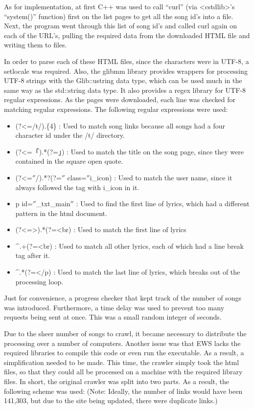 \documentclass{acm} %
\begin{document}
\begin{CJK}{UTF8}{zhsong}
As for implementation, at first C++ was used to call ``curl'' (via <cstdlib>'s ``system()'' function) first on the list pages to get all the song id's into a file. Next, the program went through this list of song id's and called curl again on each of the URL's, pulling the required data from the downloaded HTML file and writing them to files.

In order to parse each of these HTML files, since the characters were in UTF-8, a setlocale was required. Also, the glibmm library provides wrappers for processing UTF-8 strings with the Glib::ustring data type, which can be used much in the same way as the std::string data type. It also provides a regex library for UTF-8 regular expressions. As the pages were downloaded, each line was checked for matching regular expressions. The following regular expressions were used:

\begin{itemize}
 \item (?<=/t/).\{4\} : Used to match song links because all songs had a four character id under the /t/ directory.
 \item (?<=「).*(?=」) : Used to match the title on the song page, since they were contained in the square open quote.
 \item (?<=$''$/).*?(?=$''$ class=$''$i\_icon) : Used to match the user name, since it always followed the tag with i\_icon in it.
 \item p id=$''$\_txt\_main$''$ : Used to find the first line of lyrics, which had a different pattern in the html document.
 \item (?<=>).*(?=<br) : Used to match the first line of lyrics
 \item \^{}.+(?=<br) : Used to match all other lyrics, each of which had a line break tag after it.
 \item \^{}.*(?=</p) : Used to match the last line of lyrics, which breaks out of the processing loop.
\end{itemize}

Just for convenience, a progress checker that kept track of the number of songs was introduced. Furthermore, a time delay was used to prevent too many requests being sent at once. This was a small random integer of seconds.

Due to the sheer number of songs to crawl, it became necessary to distribute the processing over a number of computers. Another issue was that EWS lacks the required libraries to compile this code or even run the executable. As a result, a simplification needed to be made. This time, the crawler simply took the html files, so that they could all be processed on a machine with the required library files. In short, the original crawler was split into two parts. As a result, the following scheme was used: (Note: Ideally, the number of links would have been 141,303, but due to the site being updated, there were duplicate links.)


\end{CJK}
\end{document}
